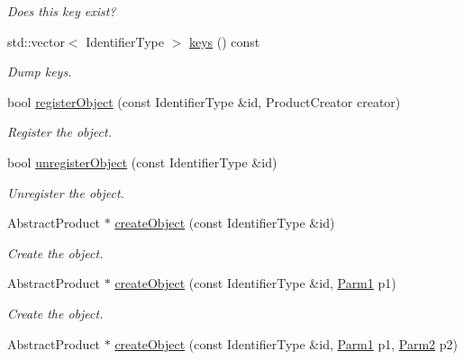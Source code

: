 \begin{DoxyCompactItemize}
\begin{DoxyCompactList}\small\item\em Does this key exist? \end{DoxyCompactList}\item 
std\+::vector$<$ Identifier\+Type $>$ \mbox{\hyperlink{classUtil_1_1ObjectFactory_a10d2a7a76f67d69f545b7fc69fdc71e0}{keys}} () const
\begin{DoxyCompactList}\small\item\em Dump keys. \end{DoxyCompactList}\item 
bool \mbox{\hyperlink{classUtil_1_1ObjectFactory_a2eb2f1fc927e23a1a266aa6fa8c6562a}{register\+Object}} (const Identifier\+Type \&id, Product\+Creator creator)
\begin{DoxyCompactList}\small\item\em Register the object. \end{DoxyCompactList}\item 
bool \mbox{\hyperlink{classUtil_1_1ObjectFactory_afec1cc774d14a18875e6176695daa422}{unregister\+Object}} (const Identifier\+Type \&id)
\begin{DoxyCompactList}\small\item\em Unregister the object. \end{DoxyCompactList}\item 
Abstract\+Product $\ast$ \mbox{\hyperlink{classUtil_1_1ObjectFactory_acda1e4c447acbb9666db46d230b1a5a1}{create\+Object}} (const Identifier\+Type \&id)
\begin{DoxyCompactList}\small\item\em Create the object. \end{DoxyCompactList}\item 
Abstract\+Product $\ast$ \mbox{\hyperlink{classUtil_1_1ObjectFactory_a0b22cb87ce4398b9529814cc0ede49e6}{create\+Object}} (const Identifier\+Type \&id, \mbox{\hyperlink{classUtil_1_1ObjectFactory_a47e4f863537be7a4f5f5972691bb0b57}{Parm1}} p1)
\begin{DoxyCompactList}\small\item\em Create the object. \end{DoxyCompactList}\item 
Abstract\+Product $\ast$ \mbox{\hyperlink{classUtil_1_1ObjectFactory_a5a083061368895d734583729bea897c0}{create\+Object}} (const Identifier\+Type \&id, \mbox{\hyperlink{classUtil_1_1ObjectFactory_a47e4f863537be7a4f5f5972691bb0b57}{Parm1}} p1, \mbox{\hyperlink{classUtil_1_1ObjectFactory_ae438d0c17d1510e6fd7db9ac479a371f}{Parm2}} p2)

\end{DoxyCompactItemize}
